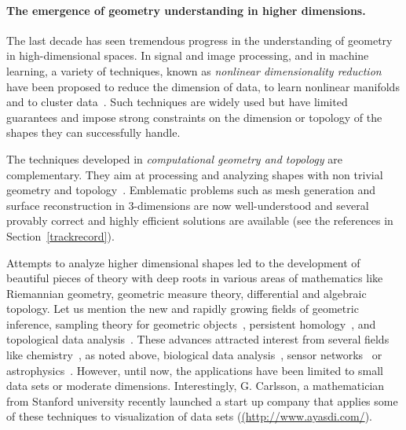 \paragraph{The emergence of geometry understanding in higher dimensions.}
The last decade has seen tremendous progress in  the understanding of geometry in high-dimensional spaces. %
In signal and image processing, and in machine learning, a variety of techniques, known as {\em nonlinear dimensionality reduction} have been proposed to reduce the dimension of data, to learn nonlinear manifolds and to cluster data~\cite{lv-nldr-2007}. %
Such techniques are widely used but have limited guarantees and 
impose strong constraints on the dimension or topology of the shapes they can successfully handle. 

The techniques developed in {\em computational geometry and topology}  are complementary. They aim at processing and analyzing shapes with non trivial geometry and topology~\cite{hh-ct-2010}.
Emblematic problems such as mesh generation and surface reconstruction in 3-dimensions are now well-understood and several provably correct and highly efficient solutions are  available (see the references in Section~\ref{trackrecord}).%

Attempts to analyze higher dimensional shapes led to the development of beautiful pieces of theory with deep roots in various areas of mathematics like Riemannian geometry, geometric measure theory, differential and algebraic topology. Let us mention the new and rapidly growing fields of geometric inference,  sampling theory for geometric objects~\cite{ccsm-gipm-2011}, persistent homology~\cite{hh-ct-2010},  and topological data analysis~\cite{gc-td-2009}.  These advances attracted interest from several fields like chemistry~\cite{mtcw-tco-2010}, as noted above, biological data analysis~\cite{fpgo-airc-2009},  %
sensor networks~\cite{rg-bptd-2008}  or astrophysics~\cite{rvw-abu-2011}.
However, until now, the applications have been limited to small data sets or moderate dimensions.
Interestingly,  G. Carlsson, a mathematician from Stanford university recently launched
a start up company that applies some of these techniques to visualization of data sets
 (\url{(http://www.ayasdi.com/}{}).


